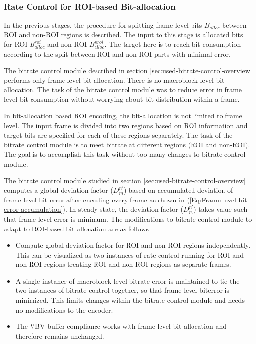 \documentclass[11pt]{article} %
\begin{document}
\subsubsection{Rate Control for ROI-based Bit-allocation}
In the previous stages, the procedure for splitting frame level bits {$B_{alloc}$} between ROI and non-ROI regions is described. The input to this stage is allocated bits for ROI $B_{alloc}^{roi}$ and non-ROI $B_{alloc}^{nroi}$. The target here is to reach bit-consumption according to the split between ROI and non-ROI parts with minimal error. 

The bitrate control module described in section \ref{sec:used-bitrate-control-overview} performs only frame level bit-allocation. There is no macroblock level bit-allocation. The task of the bitrate control module was to reduce error in frame level bit-consumption without worrying about bit-distribution within a frame. 

In bit-allocation based ROI encoding, the bit-allocation is not limited to frame level. The input frame is divided into two regions based on ROI information and target bits are specified for each of these regions separately. The task of the bitrate control module is to meet bitrate at different regions (ROI and non-ROI). The goal is to accomplish this task without too many changes to bitrate control module.

The bitrate control module studied in section \ref{sec:used-bitrate-control-overview} computes a global deviation factor ($D_m^{n'}$) based on accumulated deviation of frame level bit error after encoding every frame as shown in (\ref{Eq:Frame level bit error accumulation}). In steady-state, the deviation factor ($D_m^{n'}$) takes value such that frame level error is minimum. The modifications to bitrate control module to adapt to ROI-based bit allocation are as follows
\begin{itemize}
	\item Compute global deviation factor for ROI and non-ROI regions independently. This can be visualized as two instances of rate control running for ROI and non-ROI regions treating ROI and non-ROI regions as separate frames.
	\item A single instance of macroblock level bitrate error is maintained to tie the two instances of bitrate control together, so that frame level biterror is minimized. This limits changes within the bitrate control module and needs no modifications to the encoder.
	\item The VBV buffer compliance works with frame level bit allocation and therefore remains unchanged.
\end{itemize} 
\end{document}
